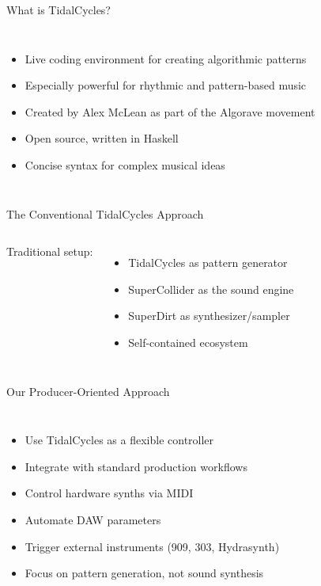 \documentclass{beamer}
\begin{document}
\begin{frame}{What is TidalCycles?}
\begin{columns}
\begin{itemize}
    \item Live coding environment for creating algorithmic patterns
    \item Especially powerful for rhythmic and pattern-based music
    \item Created by Alex McLean as part of the Algorave movement
    \item Open source, written in Haskell
    \item Concise syntax for complex musical ideas
\end{itemize}

\begin{center}

\end{center}
\end{columns}
\end{frame}

\begin{frame}{The Conventional TidalCycles Approach}
\begin{columns}
Traditional setup:
\begin{itemize}
    \item TidalCycles as pattern generator
    \item SuperCollider as the sound engine
    \item SuperDirt as synthesizer/sampler
    \item Self-contained ecosystem
\end{itemize}

\begin{center}
\end{center}
\end{columns}
\end{frame}

\begin{frame}{Our Producer-Oriented Approach}
\begin{columns}
\begin{itemize}
    \item Use TidalCycles as a flexible controller
    \item Integrate with standard production workflows
    \item Control hardware synths via MIDI
    \item Automate DAW parameters
    \item Trigger external instruments (909, 303, Hydrasynth)
    \item Focus on pattern generation, not sound synthesis
\end{itemize}


\end{columns}
\end{frame}
\end{document}
